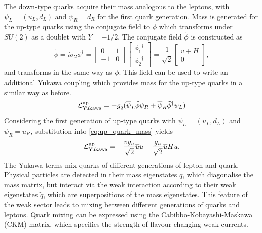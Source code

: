 The down-type quarks acquire their mass analogous to the leptons, with $\psi_L = (u_L, d_L)$ and $\psi_R = d_R$ for the first quark generation.
Mass is generated for the up-type quarks using the conjugate field to $\phi$ which transforms under $SU(2)$ as a doublet with $Y = -1/2$.
The conjugate field $\tilde{\phi}$ is constructed as
%
\begin{equation}\label{phi c field definition}
    \tilde{\phi} = 
    i \sigma_2 \phi^\dagger = 
    \begin{bmatrix}
    0 & 1 \\ -1 & 0
    \end{bmatrix} 
    \begin{bmatrix}
    {\phi_1}^\dagger \\ {\phi_2}^\dagger
    \end{bmatrix} =
    \frac{1}{\sqrt{2}}\begin{bmatrix}
      v + H \\ 0
    \end{bmatrix}
    ,
\end{equation}
%
and transforms in the same way as $\phi$. 
This field can be used to write an additional Yukawa coupling which provides mass for the up-type quarks in a similar way as before.
%
\begin{equation}\label{eq:up_quark_mass}
  \mathcal{L}_{\textnormal{Yukawa}}^{\textnormal{up}} = 
  - g_q (\overline{\psi}_L \tilde{\phi} \psi_R + \overline{\psi}_R \tilde{\phi}^\dagger \psi_L)
\end{equation}
%
Considering the first generation of up-type quarks with $\psi_L = (u_L, d_L)$ and $\psi_R = u_R$, substitution into \cref{eq:up_quark_mass} yields 
%
\begin{equation}
  \mathcal{L}_{\textnormal{Yukawa}}^{\textnormal{up}} = 
  - \frac{v g_u}{\sqrt{2}} \overline{u} u
  - \frac{g_u}{\sqrt{2}} \overline{u} H u .
\end{equation}
%
The Yukawa terms mix quarks of different generations of lepton and quark.
Physical particles are detected in their mass eigenstates $q$, which diagonalise the mass matrix, but interact via the weak interaction according to their weak eigenstates $\tilde{q}$, which are superpositions of the mass eigenstates.
This feature of the weak sector leads to mixing between different generations of quarks and leptons.
Quark mixing can be expressed using the Cabibbo-Kobayashi-Maskawa (CKM) matrix, which specifies the strength of flavour-changing weak currents.
